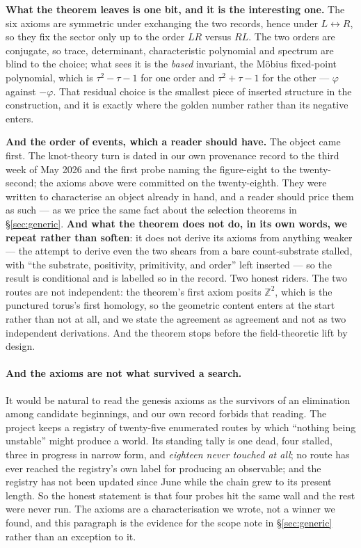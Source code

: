 \documentclass[11pt,a4paper]{article}
\theoremstyle{definition}
\theoremstyle{remark}
\newcommand{\Z}{\mathbb{Z}}
\begin{document}
\textbf{What the theorem leaves is one bit, and it is the interesting one.} The six axioms are symmetric under
exchanging the two records, hence under $L \leftrightarrow R$, so they fix the sector only up to the order $LR$ versus
$RL$. The two orders are conjugate, so trace, determinant, characteristic polynomial and spectrum are blind to the
choice; what sees it is the \emph{based} invariant, the M\"obius fixed-point polynomial, which is
$\tau^2 - \tau - 1$ for one order and $\tau^2 + \tau - 1$ for the other --- $\varphi$ against $-\varphi$. That residual
choice is the smallest piece of inserted structure in the construction, and it is exactly where the golden number
rather than its negative enters.

\textbf{And the order of events, which a reader should have.} The object came first. The knot-theory turn is dated in
our own provenance record to the third week of May 2026 and the first probe naming the figure-eight to the twenty-second;
the axioms above were committed on the twenty-eighth. They were written to characterise an object already in hand, and
a reader should price them as such --- as we price the same fact about the selection theorems in \S\ref{sec:generic}. \textbf{And what the theorem does not do, in its own words, we repeat rather than
soften}: it does not derive its axioms from anything weaker --- the attempt to derive even the two shears from a bare
count-substrate stalled, with ``the substrate, positivity, primitivity, and order'' left inserted --- so the result is
conditional and is labelled so in the record. Two honest riders. The two routes are not independent: the theorem's
first axiom posits $\Z^2$, which is the punctured torus's first homology, so the geometric content enters at the start
rather than not at all, and we state the agreement as agreement and not as two independent derivations. And the
theorem stops before the field-theoretic lift by design.

\paragraph{And the axioms are not what survived a search.} It would be natural to read the genesis axioms as the
survivors of an elimination among candidate beginnings, and our own record forbids that reading. The project keeps a
registry of twenty-five enumerated routes by which ``nothing being unstable'' might produce a world. Its standing tally
is one dead, four stalled, three in progress in narrow form, and \emph{eighteen never touched at all}; no route has ever
reached the registry's own label for producing an observable; and the registry has not been updated since June while the
chain grew to its present length. So the honest statement is that four probes hit the same wall and the rest were never
run. The axioms are a characterisation we wrote, not a winner we found, and this paragraph is the evidence for the
scope note in \S\ref{sec:generic} rather than an exception to it.
\end{document}
